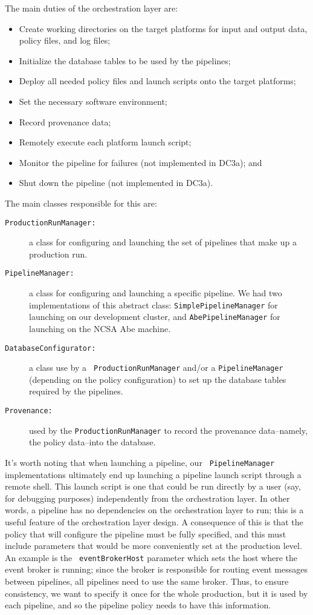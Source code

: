 The main duties of the orchestration layer are:
\begin{itemize}
\item Create working directories on the target platforms for input and
  output data, policy files, and log files;
\item Initialize the database tables to be used by the pipelines;
\item Deploy all needed policy files and launch scripts onto the
  target platforms;
\item Set the necessary software environment;
\item Record provenance data;
\item Remotely execute each platform launch script;
\item Monitor the pipeline for failures (not implemented in DC3a); and
\item Shut down the pipeline (not implemented in DC3a).
\end{itemize}

The main classes responsible for this are:

\begin{description}
\item[\tt ProductionRunManager:]  a class for configuring and launching the
set of pipelines that make up a production run.  
\item[\tt PipelineManager:]  a class for configuring and launching a
specific pipeline.  We had two implementations of this abstract class:
{\tt SimplePipelineManager} for launching on our development cluster,
and {\tt AbePipelineManager} for launching on the NCSA Abe machine.  
\item[\tt DatabaseConfigurator:]  a class use by a {\tt
ProductionRunManager} and/or a {\tt PipelineManager} (depending on the
policy configuration) to set up the database tables required by the
pipelines.  
\item[\tt Provenance:]  used by the {\tt ProductionRunManager} to
record the provenance data--namely, the policy data--into the
database.  
\end{description}

It's worth noting that when launching a pipeline, our {\tt
PipelineManager} implementations ultimately end up launching a
pipeline launch script through a remote shell.   This launch script is
one that could be run directly by a user (say, for debugging purposes)
independently from the orchestration layer.  In other words, a
pipeline has no dependencies on the orchestration layer to run; this
is a useful feature of the orchestration layer design.  A consequence
of this is that the policy that will configure the pipeline must be
fully specified, and this must include parameters that would be more
conveniently set at the production level.  An example is the {\tt
eventBrokerHost} parameter which sets the host where the event broker
is running; since the broker is responsible for routing event messages
between pipelines, all pipelines need to use the same broker.  Thus,
to ensure consistency, we want to specify it once for the whole
production, but it is used by each pipeline, and so the pipeline
policy needs to have this information.  

